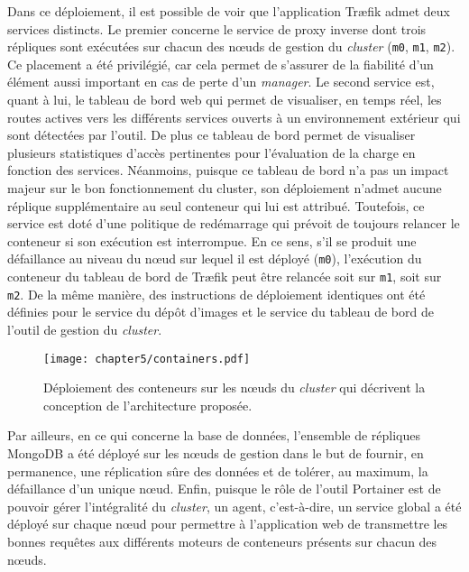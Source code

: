 Dans ce déploiement, il est possible de voir que l'application Tr\ae{}fik admet deux services distincts. Le premier concerne le service de proxy inverse dont trois répliques sont exécutées sur chacun des n\oe{}uds de gestion du \textit{cluster} (\texttt{m0}, \texttt{m1}, \texttt{m2}). Ce placement a été privilégié, car cela permet de s'assurer de la fiabilité d'un élément aussi important en cas de perte d'un \textit{manager}. Le second service est, quant à lui, le tableau de bord web qui permet de visualiser, en temps réel, les routes actives vers les différents services ouverts à un environnement extérieur qui sont détectées par l'outil. De plus ce tableau de bord permet de visualiser plusieurs statistiques d'accès pertinentes pour l'évaluation de la charge en fonction des services. Néanmoins, puisque ce tableau de bord n'a pas un impact majeur sur le bon fonctionnement du cluster, son déploiement n'admet aucune réplique supplémentaire au seul conteneur qui lui est attribué. Toutefois, ce service est doté d'une politique de redémarrage qui prévoit de toujours relancer le conteneur si son exécution est interrompue. En ce sens, s'il se produit une défaillance au niveau du n\oe{}ud sur lequel il est déployé (\texttt{m0}), l'exécution du conteneur du tableau de bord de Tr\ae{}fik peut être relancée soit sur \texttt{m1}, soit sur \texttt{m2}. De la même manière, des instructions de déploiement identiques ont été définies pour le service du dépôt d'images et le service du tableau de bord de l'outil de gestion du \textit{cluster}.

\begin{figure}[ht!]
	\centering
	\texttt{[image: chapter5/containers.pdf]}
        \caption{Déploiement des conteneurs sur les n\oe{}uds du \textit{cluster} qui décrivent la conception de l'architecture proposée.}
	\label{fig:containers}
\end{figure}

Par ailleurs, en ce qui concerne la base de données, l'ensemble de répliques MongoDB a été déployé sur les n\oe{}uds de gestion dans le but de fournir, en permanence, une réplication sûre des données et de tolérer, au maximum, la défaillance d'un unique n\oe{}ud. Enfin, puisque le rôle de l'outil Portainer est de pouvoir gérer l'intégralité du \textit{cluster}, un agent, c'est-à-dire, un service global a été déployé sur chaque n\oe{}ud pour permettre à l'application web de transmettre les bonnes requêtes aux différents moteurs de conteneurs présents sur chacun des n\oe{}uds.

